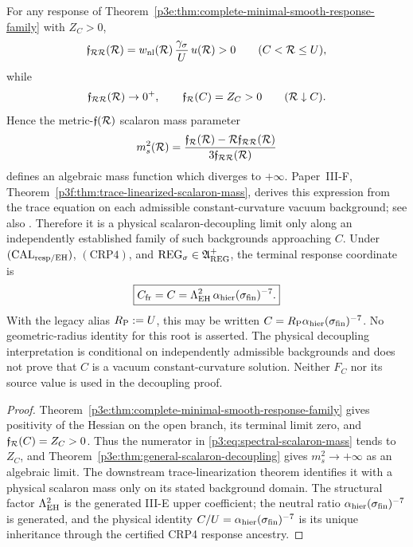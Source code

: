 \documentclass[12pt,a4paper]{article}
\begin{document}
\begin{theorem}
\label{p3:thm:scalar-threshold}
For any response of
Theorem~\ref{p3e:thm:complete-minimal-smooth-response-family} with
\(Z_C>0\),
\[
 \mathfrak f_{\mathcal R\mathcal R}(\mathcal R)
 =w_{\rm nl}(\mathcal R)\,\frac{\gamma_\sigma}{U}\,u(\mathcal R)>0
 \qquad(C<\mathcal R\le U),
\]
while
\[
 \mathfrak f_{\mathcal R\mathcal R}(\mathcal R)\to0^+,
 \qquad
 \mathfrak f_{\mathcal R}(C)=Z_C>0
 \qquad(\mathcal R\downarrow C).
\]
Hence the metric-\(\mathfrak f(\mathcal R)\) scalaron mass parameter
\begin{equation}
\label{p3:eq:spectral-scalaron-mass}
 m_s^2(\mathcal R)
 =\frac{\mathfrak f_{\mathcal R}(\mathcal R)
        -\mathcal R\mathfrak f_{\mathcal R\mathcal R}(\mathcal R)}
       {3\mathfrak f_{\mathcal R\mathcal R}(\mathcal R)}
\end{equation}
defines an algebraic mass function which diverges to \(+\infty\).  Paper~III-F,
Theorem~\ref{p3f:thm:trace-linearized-scalaron-mass}, derives this expression
from the trace equation on each admissible constant-curvature vacuum
background; see also \cite{DeFelice2010}.  Therefore it is a physical
scalaron-decoupling limit only along an independently established family of
such backgrounds approaching \(C\).  Under
\((\mathrm{CAL}_{\rm resp/EH})\), \((\mathrm{CRP4})\), and
\(\mathrm{REG}_{\sigma}\in\mathfrak A_{\rm REG}^{+}\), the terminal response coordinate is
\[
 \boxed{C_{\rm fr}=C=
 \Lambda_{\rm EH}^2\,
 \alpha_{\rm hier}(\sigma_{\rm fin})^{-7}.}
\]
With the legacy alias \(R_{\mathrm P}:=U\), this may be written
\(C=R_{\mathrm P}\alpha_{\rm hier}(\sigma_{\rm fin})^{-7}\).
No geometric-radius identity for this root is asserted.  The physical
decoupling interpretation is conditional on independently admissible
backgrounds and does not prove that \(C\) is a vacuum constant-curvature
solution.  Neither \(F_C\) nor its
source value is used in the decoupling proof.
\end{theorem}

\begin{proof}
Theorem~\ref{p3e:thm:complete-minimal-smooth-response-family} gives positivity of
the Hessian on the open branch, its terminal limit zero, and
\(\mathfrak f_{\mathcal R}(C)=Z_C>0\).  Thus the numerator in
\eqref{p3:eq:spectral-scalaron-mass} tends to \(Z_C\), and
Theorem~\ref{p3e:thm:general-scalaron-decoupling} gives
\(m_s^2\to+\infty\) as an algebraic limit.  The downstream
trace-linearization theorem identifies it with a physical scalaron mass only
on its stated background domain.  The structural factor
\(\Lambda_{\rm EH}^2\) is the generated III-E upper coefficient; the neutral ratio
\(\alpha_{\rm hier}(\sigma_{\rm fin})^{-7}\) is generated, and the physical
identity \(C/U=\alpha_{\rm hier}(\sigma_{\rm fin})^{-7}\) is its unique
inheritance through the certified CRP4 response ancestry.
\end{proof}
\end{document}
